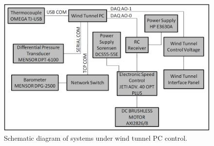 \begin{figure}[H]
\centering
\includegraphics[width=5in]{figs/setup/odulswt_control}
\caption{Schematic diagram of systems under wind tunnel PC control.}
\label{fig:control_diagram}
\end{figure}


